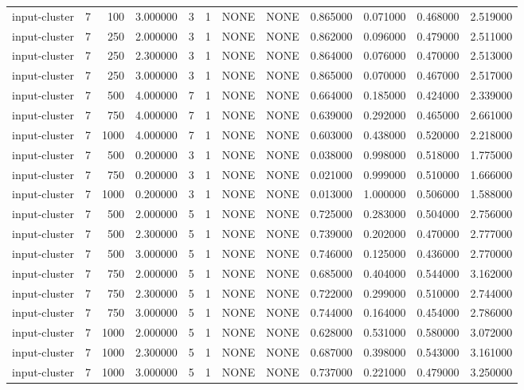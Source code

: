 \begin{tabular}{lrrrllllrrrr}
input-cluster & 7 & 100 & 3.000000 & 3 & 1 & NONE & NONE & 0.865000 & 0.071000 & 0.468000 & 2.519000 \\
input-cluster & 7 & 250 & 2.000000 & 3 & 1 & NONE & NONE & 0.862000 & 0.096000 & 0.479000 & 2.511000 \\
input-cluster & 7 & 250 & 2.300000 & 3 & 1 & NONE & NONE & 0.864000 & 0.076000 & 0.470000 & 2.513000 \\
input-cluster & 7 & 250 & 3.000000 & 3 & 1 & NONE & NONE & 0.865000 & 0.070000 & 0.467000 & 2.517000 \\
input-cluster & 7 & 500 & 4.000000 & 7 & 1 & NONE & NONE & 0.664000 & 0.185000 & 0.424000 & 2.339000 \\
input-cluster & 7 & 750 & 4.000000 & 7 & 1 & NONE & NONE & 0.639000 & 0.292000 & 0.465000 & 2.661000 \\
input-cluster & 7 & 1000 & 4.000000 & 7 & 1 & NONE & NONE & 0.603000 & 0.438000 & 0.520000 & 2.218000 \\
input-cluster & 7 & 500 & 0.200000 & 3 & 1 & NONE & NONE & 0.038000 & 0.998000 & 0.518000 & 1.775000 \\
input-cluster & 7 & 750 & 0.200000 & 3 & 1 & NONE & NONE & 0.021000 & 0.999000 & 0.510000 & 1.666000 \\
input-cluster & 7 & 1000 & 0.200000 & 3 & 1 & NONE & NONE & 0.013000 & 1.000000 & 0.506000 & 1.588000 \\
input-cluster & 7 & 500 & 2.000000 & 5 & 1 & NONE & NONE & 0.725000 & 0.283000 & 0.504000 & 2.756000 \\
input-cluster & 7 & 500 & 2.300000 & 5 & 1 & NONE & NONE & 0.739000 & 0.202000 & 0.470000 & 2.777000 \\
input-cluster & 7 & 500 & 3.000000 & 5 & 1 & NONE & NONE & 0.746000 & 0.125000 & 0.436000 & 2.770000 \\
input-cluster & 7 & 750 & 2.000000 & 5 & 1 & NONE & NONE & 0.685000 & 0.404000 & 0.544000 & 3.162000 \\
input-cluster & 7 & 750 & 2.300000 & 5 & 1 & NONE & NONE & 0.722000 & 0.299000 & 0.510000 & 2.744000 \\
input-cluster & 7 & 750 & 3.000000 & 5 & 1 & NONE & NONE & 0.744000 & 0.164000 & 0.454000 & 2.786000 \\
input-cluster & 7 & 1000 & 2.000000 & 5 & 1 & NONE & NONE & 0.628000 & 0.531000 & 0.580000 & 3.072000 \\
input-cluster & 7 & 1000 & 2.300000 & 5 & 1 & NONE & NONE & 0.687000 & 0.398000 & 0.543000 & 3.161000 \\
input-cluster & 7 & 1000 & 3.000000 & 5 & 1 & NONE & NONE & 0.737000 & 0.221000 & 0.479000 & 3.250000 \\

\end{tabular}
